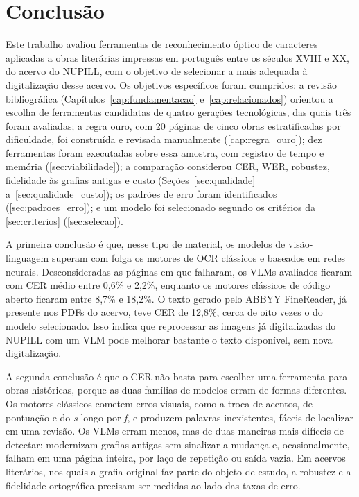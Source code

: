 \documentclass[noabntexcite,oneside]{ufsc-thesis-rn46-2019}
\begin{document}
\chapter{Conclusão}
\label{cap:conclusao}

Este trabalho avaliou ferramentas de reconhecimento óptico de caracteres aplicadas a
obras literárias impressas em português entre os séculos XVIII e XX, do acervo do NUPILL,
com o objetivo de selecionar a mais adequada à digitalização desse acervo. Os objetivos
específicos foram cumpridos: a revisão bibliográfica (Capítulos~\ref{cap:fundamentacao}
e~\ref{cap:relacionados}) orientou a escolha de ferramentas candidatas de quatro gerações tecnológicas, das quais três foram avaliadas; a regra ouro, com
20 páginas de cinco obras estratificadas por dificuldade, foi construída e revisada
manualmente (\autoref{cap:regra_ouro}); dez ferramentas foram executadas sobre essa
amostra, com registro de tempo e memória (\autoref{sec:viabilidade}); a comparação
considerou CER, WER, robustez, fidelidade às grafias antigas e custo
(Seções~\ref{sec:qualidade} a~\ref{sec:qualidade_custo}); os padrões de erro foram
identificados (\autoref{sec:padroes_erro}); e um modelo foi selecionado segundo os
critérios da \autoref{sec:criterios} (\autoref{sec:selecao}).

A primeira conclusão é que, nesse tipo de material, os modelos de visão-linguagem superam
com folga os motores de OCR clássicos e baseados em redes neurais. Desconsideradas as
páginas em que falharam, os VLMs avaliados ficaram com CER médio entre 0,6\% e 2,2\%,
enquanto os motores clássicos de código aberto ficaram entre 8,7\% e 18,2\%. O texto gerado
pelo ABBYY FineReader, já presente nos PDFs do acervo, teve CER de 12,8\%, cerca de oito
vezes o do modelo selecionado. Isso indica que reprocessar as imagens já digitalizadas do
NUPILL com um VLM pode melhorar bastante o texto disponível, sem nova digitalização.

A segunda conclusão é que o CER não basta para escolher uma ferramenta para obras
históricas, porque as duas famílias de modelos erram de formas diferentes. Os motores
clássicos cometem erros visuais, como a troca de acentos, de pontuação e do \textit{s}
longo por \textit{f}, e produzem palavras inexistentes, fáceis de localizar em uma
revisão. Os VLMs erram menos, mas de duas maneiras mais difíceis de detectar: modernizam
grafias antigas sem sinalizar a mudança e, ocasionalmente, falham em uma página inteira,
por laço de repetição ou saída vazia. Em acervos literários, nos quais a grafia original
faz parte do objeto de estudo, a robustez e a fidelidade ortográfica precisam ser medidas
ao lado das taxas de erro.
\end{document}
